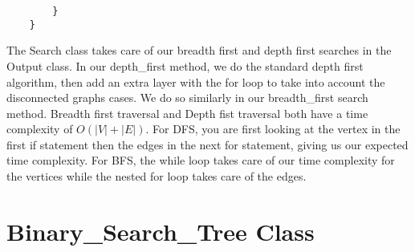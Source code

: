 \documentclass{article}
\begin{document}
\begin{lstlisting}
        }
    }

    \end{lstlisting}
The Search class takes care of our breadth first and depth first searches in the Output class.  In our depth\_first method, we do the standard depth first algorithm, then add an extra layer with the for loop to take into account the disconnected graphs cases.  We do so similarly in our breadth\_first search method.  Breadth first traversal and Depth fist traversal both have a time complexity of $O(|V| + |E|)$.  For DFS, you are first looking at the vertex in the first if statement then the edges in the next for statement, giving us our expected time complexity.  For BFS, the while loop takes care of our time complexity for the vertices while the nested for loop takes care of the edges.

\section{Binary\_Search\_Tree Class}
\end{document}
